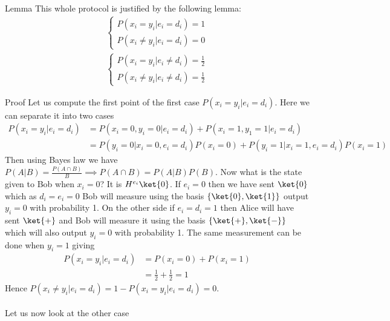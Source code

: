 \begin{parag}{Lemma}
    This whole protocol is justified by the following lemma:
	\begin{align*} 
		\begin{cases}
			P\left(x_i = y_i | e_i = d_i\right) = 1\\
			P(x_i \neq y_i | e_i = d_i)= 0
		\end{cases}   \\
		\begin{cases}
			P\left(x_i = y_i | e_i \neq d_i\right)  = \frac{1}{2}\\
			P\left(x_i \neq y_i | e_i \neq d_i\right) = \frac{1}{2}
		\end{cases} 
	\end{align*}
\end{parag}
\begin{parag}{Proof}
    Let us compute the first point of the first case $P\left(x_i = y_i | e_i = d_i\right)$. Here we can separate it into two cases
	\begin{align*} 
		P\left(x_i = y_i | e_i = d_i\right) &= P\left(x_i = 0, y_i = 0| e_i= d_i\right) + P\left(x_i = 1, y_1 = 1| e_i = d_i\right) \\
											&=  P\left(y_i = 0| x_i = 0, e_i = d_i\right)P\left(x_i = 0\right) + P\left(y_i = 1| x_i = 1, e_i = d_i\right)P\left(x_i= 1\right)
	\end{align*}
	Then using Bayes law we have $P\left(A|B\right) = \frac{P\left(A \cap B\right)}{B} \implies P\left(A \cap B\right) = P\left(A|B\right) P\left(B\right)$. Now what is the state given to Bob when $x_i = 0$? It is $H^{e_i}\ket{0}$. If $e_i = 0$ then we have sent $\ket{0}$ which as $d_i = e_i = 0$ Bob will measure using the basis $\left\{\ket{0}, \ket{1}\right\}$ output $y_i = 0$ with probability 1. On the other side if $e_i = d_i = 1$ then Alice will have sent $\ket{+}$ and Bob will measure it using the basis $\left\{\ket{+}, \ket{-}\right\}$ which will also output $y_i = 0$ with probability 1. The same measurement can be done when $y_i = 1$ giving 
	\begin{align*} 
		P\left(x_i = y_i | e_i = d_i\right) &= P\left(x_i = 0\right) + P\left(x_i = 1\right) \\
											&= \frac{1}{2} + \frac{1}{2} = 1
	\end{align*}
	Hence $P\left(x_i \neq y_i|e_i = d_i\right) =  1 - P\left(x_i = y_i |e_i = d_i\right) = 0$.\\
	$ $\\
	Let us now look at the other case 

\end{parag}
